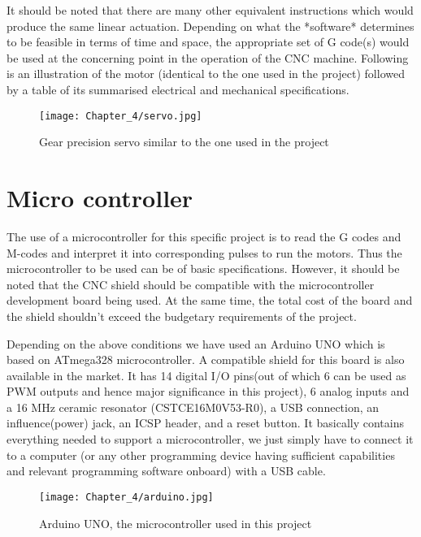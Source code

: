 It should be noted that there are many other equivalent instructions which would produce the same linear actuation. Depending on what the *software* determines to be feasible in terms of time and space, the appropriate set of G code(s) would be used at the concerning point in the operation of the CNC machine. Following is an illustration of the motor (identical to the one used in the project) followed by a table of its summarised electrical and mechanical specifications.

\begin{figure}[h]
    \centering
    \texttt{[image: Chapter\_4/servo.jpg]}
    \caption{Gear precision servo similar to the one used in the project}
    \label{fig:servo}
\end{figure}


\section{Micro controller}

The use of a microcontroller for this specific project is to read the G codes and M-codes and interpret it into corresponding pulses to run the motors. Thus the microcontroller to be used can be of basic specifications. However, it should be noted that the CNC shield should be compatible with the microcontroller development board being used. At the same time, the total cost of the board and the shield shouldn’t exceed the budgetary requirements of the project. \par

Depending on the above conditions we have used an Arduino UNO which is based on ATmega328 microcontroller. A compatible shield for this board is also available in the market. It has 14 digital I/O pins(out of which 6 can be used as PWM outputs and hence major significance in this project), 6 analog inputs and a 16 MHz ceramic resonator (CSTCE16M0V53-R0), a USB connection, an influence(power) jack, an ICSP header, and a reset button. It basically contains everything needed to support a microcontroller, we just simply have to connect it to a computer (or any other programming device having sufficient capabilities and relevant programming software onboard) with a USB cable.

\begin{figure}[h]
    \centering
    \texttt{[image: Chapter\_4/arduino.jpg]}
    \caption{Arduino UNO, the microcontroller used in this project}
    \label{fig:arduino}
\end{figure}

